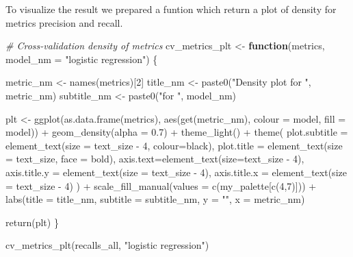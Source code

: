 \documentclass[
]{report}
\newenvironment{Shaded}{\begin{snugshade}}{\end{snugshade}}
\newcommand{\AttributeTok}[1]{\textcolor[rgb]{0.77,0.63,0.00}{#1}}
\newcommand{\CommentTok}[1]{\textcolor[rgb]{0.56,0.35,0.01}{\textit{#1}}}
\newcommand{\ControlFlowTok}[1]{\textcolor[rgb]{0.13,0.29,0.53}{\textbf{#1}}}
\newcommand{\DecValTok}[1]{\textcolor[rgb]{0.00,0.00,0.81}{#1}}
\newcommand{\FloatTok}[1]{\textcolor[rgb]{0.00,0.00,0.81}{#1}}
\newcommand{\FunctionTok}[1]{\textcolor[rgb]{0.00,0.00,0.00}{#1}}
\newcommand{\NormalTok}[1]{#1}
\newcommand{\OtherTok}[1]{\textcolor[rgb]{0.56,0.35,0.01}{#1}}
\newcommand{\SpecialCharTok}[1]{\textcolor[rgb]{0.00,0.00,0.00}{#1}}
\newcommand{\StringTok}[1]{\textcolor[rgb]{0.31,0.60,0.02}{#1}}
\begin{document}
To visualize the result we prepared a funtion which return a plot of
density for metrics precision and recall.

\begin{Shaded}
\begin{Highlighting}[]
\CommentTok{\# Cross{-}validation density of metrics}
\NormalTok{cv\_metrics\_plt }\OtherTok{\textless{}{-}} \ControlFlowTok{function}\NormalTok{(metrics, }\AttributeTok{model\_nm =} \StringTok{"logistic regression"}\NormalTok{) \{}
  
\NormalTok{  metric\_nm }\OtherTok{\textless{}{-}} \FunctionTok{names}\NormalTok{(metrics)[}\DecValTok{2}\NormalTok{]}
\NormalTok{  title\_nm }\OtherTok{\textless{}{-}} \FunctionTok{paste0}\NormalTok{(}\StringTok{"Density plot for "}\NormalTok{, metric\_nm)}
\NormalTok{  subtitle\_nm }\OtherTok{\textless{}{-}} \FunctionTok{paste0}\NormalTok{(}\StringTok{"for "}\NormalTok{, model\_nm)}
  
\NormalTok{  plt }\OtherTok{\textless{}{-}} \FunctionTok{ggplot}\NormalTok{(}\FunctionTok{as.data.frame}\NormalTok{(metrics), }\FunctionTok{aes}\NormalTok{(}\FunctionTok{get}\NormalTok{(metric\_nm), }\AttributeTok{colour =}\NormalTok{ model, }\AttributeTok{fill =}\NormalTok{ model)) }\SpecialCharTok{+}
    \FunctionTok{geom\_density}\NormalTok{(}\AttributeTok{alpha =} \FloatTok{0.7}\NormalTok{) }\SpecialCharTok{+}
    \FunctionTok{theme\_light}\NormalTok{() }\SpecialCharTok{+}
    \FunctionTok{theme}\NormalTok{(}
      \AttributeTok{plot.subtitle =} \FunctionTok{element\_text}\NormalTok{(}\AttributeTok{size =}\NormalTok{ text\_size }\SpecialCharTok{{-}} \DecValTok{4}\NormalTok{, }\AttributeTok{colour=}\StringTok{\textquotesingle{}black\textquotesingle{}}\NormalTok{),}
      \AttributeTok{plot.title =} \FunctionTok{element\_text}\NormalTok{(}\AttributeTok{size =}\NormalTok{ text\_size, }\AttributeTok{face =} \StringTok{\textquotesingle{}bold\textquotesingle{}}\NormalTok{),}
      \AttributeTok{axis.text=}\FunctionTok{element\_text}\NormalTok{(}\AttributeTok{size=}\NormalTok{text\_size }\SpecialCharTok{{-}} \DecValTok{4}\NormalTok{), }
      \AttributeTok{axis.title.y =} \FunctionTok{element\_text}\NormalTok{(}\AttributeTok{size =}\NormalTok{ text\_size }\SpecialCharTok{{-}} \DecValTok{4}\NormalTok{), }
      \AttributeTok{axis.title.x =} \FunctionTok{element\_text}\NormalTok{(}\AttributeTok{size =}\NormalTok{ text\_size }\SpecialCharTok{{-}} \DecValTok{4}\NormalTok{)}
\NormalTok{    ) }\SpecialCharTok{+}
    \FunctionTok{scale\_fill\_manual}\NormalTok{(}\AttributeTok{values =} \FunctionTok{c}\NormalTok{(my\_palette[}\FunctionTok{c}\NormalTok{(}\DecValTok{4}\NormalTok{,}\DecValTok{7}\NormalTok{)]))  }\SpecialCharTok{+} 
    \FunctionTok{labs}\NormalTok{(}\AttributeTok{title =}\NormalTok{ title\_nm,}
         \AttributeTok{subtitle =}\NormalTok{ subtitle\_nm,}
         \AttributeTok{y =} \StringTok{""}\NormalTok{,}
         \AttributeTok{x =}\NormalTok{ metric\_nm)}
  
  \FunctionTok{return}\NormalTok{(plt)}
\NormalTok{\}}

\FunctionTok{cv\_metrics\_plt}\NormalTok{(recalls\_all, }\StringTok{"logistic regression"}\NormalTok{)}
\end{Highlighting}
\end{Shaded}
\end{document}
